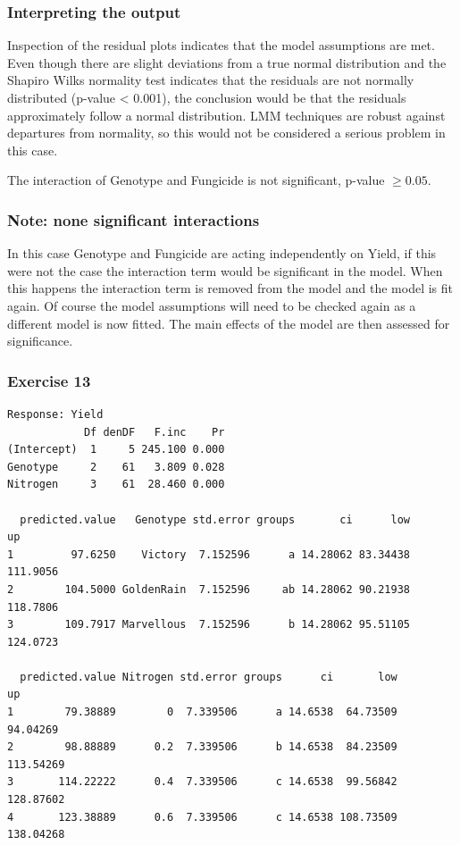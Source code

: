 \begin{frame}\frametitle{Interpreting the output}
Inspection of the residual plots indicates that the model
assumptions are met. Even though there are slight deviations
from a true normal distribution and the Shapiro Wilks
normality test indicates that the residuals are not normally
distributed (p-value < 0.001), the conclusion would be that
the residuals approximately follow a normal distribution.
LMM techniques are robust against departures from normality,
so this would not be considered a serious problem in this
case.

The interaction of Genotype and Fungicide is not significant,
p-value $\ge 0.05$.
\end{frame}

\begin{frame}\frametitle{Note: none significant interactions}
In this case Genotype and Fungicide are acting independently on Yield, if this were not the case the interaction
term would be significant in the model. When this happens the interaction term is removed from the model and
the model is fit again. Of course the model assumptions will need to be checked again as a different model is
now fitted. The main effects of the model are then assessed for significance.
\end{frame}


\begin{frame}[fragile]\frametitle{Exercise 13}
\begin{verbatim}
Response: Yield
            Df denDF   F.inc    Pr
(Intercept)  1     5 245.100 0.000
Genotype     2    61   3.809 0.028
Nitrogen     3    61  28.460 0.000

  predicted.value   Genotype std.error groups       ci      low       up
1         97.6250    Victory  7.152596      a 14.28062 83.34438 111.9056
2        104.5000 GoldenRain  7.152596     ab 14.28062 90.21938 118.7806
3        109.7917 Marvellous  7.152596      b 14.28062 95.51105 124.0723

  predicted.value Nitrogen std.error groups      ci       low        up
1        79.38889        0  7.339506      a 14.6538  64.73509  94.04269
2        98.88889      0.2  7.339506      b 14.6538  84.23509 113.54269
3       114.22222      0.4  7.339506      c 14.6538  99.56842 128.87602
4       123.38889      0.6  7.339506      c 14.6538 108.73509 138.04268

\end{verbatim}
\end{frame}

